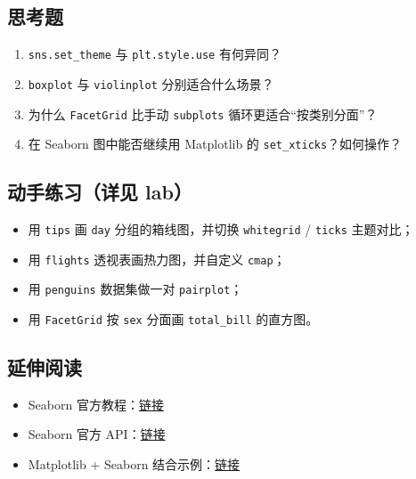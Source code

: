 \subsection{思考题}\label{ux601dux8003ux9898-18}

\begin{enumerate}
\def\labelenumi{\arabic{enumi}.}
\tightlist
\item
  \texttt{sns.set\_theme} 与 \texttt{plt.style.use} 有何异同？
\item
  \texttt{boxplot} 与 \texttt{violinplot} 分别适合什么场景？
\item
  为什么 \texttt{FacetGrid} 比手动 \texttt{subplots}
  循环更适合``按类别分面''？
\item
  在 Seaborn 图中能否继续用 Matplotlib 的
  \texttt{set\_xticks}？如何操作？
\end{enumerate}

\subsection{动手练习（详见
lab）}\label{ux52a8ux624bux7ec3ux4e60ux8be6ux89c1-lab-10}

\begin{itemize}
\tightlist
\item
  用 \texttt{tips} 画 \texttt{day} 分组的箱线图，并切换
  \texttt{whitegrid} / \texttt{ticks} 主题对比；
\item
  用 \texttt{flights} 透视表画热力图，并自定义 \texttt{cmap}；
\item
  用 \texttt{penguins} 数据集做一对 \texttt{pairplot}；
\item
  用 \texttt{FacetGrid} 按 \texttt{sex} 分面画 \texttt{total\_bill}
  的直方图。
\end{itemize}

\subsection{延伸阅读}\label{ux5ef6ux4f38ux9605ux8bfb-23}

\begin{itemize}
\tightlist
\item
  Seaborn
  官方教程：\href{https://seaborn.pydata.org/tutorial.html}{链接}
\item
  Seaborn 官方 API：\href{https://seaborn.pydata.org/api.html}{链接}
\item
  Matplotlib + Seaborn
  结合示例：\href{https://seaborn.pydata.org/examples/index.html}{链接}
\end{itemize}

